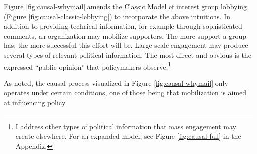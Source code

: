 

Figure \ref{fig:causal-whymail} amends the Classic Model of interest group lobbying (Figure \ref{fig:causal-classic-lobbying}) to incorporate the above intuitions. In addition to providing technical information, for example through sophisticated comments, an organization may mobilize supporters. The more support a group has, the more successful this effort will be. Large-scale engagement may produce several types of relevant political information. The most direct and obvious is the expressed ``public opinion'' that policymakers observe.\footnote{I address other types of political information that mass engagement may create elsewhere. For an expanded model, see Figure \ref{fig:causal-full} in the Appendix.}

As noted, the causal process visualized in Figure \ref{fig:causal-whymail} only operates under certain conditions, one of those being that mobilization is aimed at influencing policy. 
